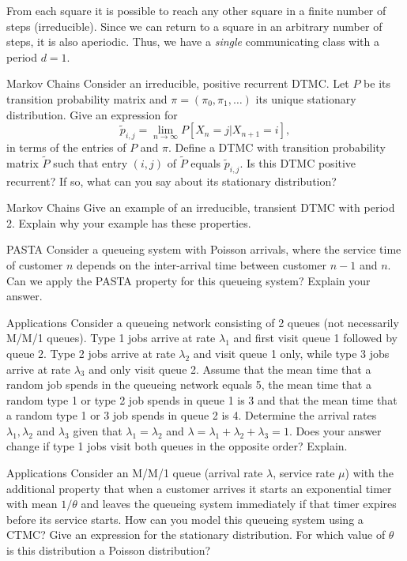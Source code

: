 \begin{solution}
  From each square it is possible to reach any other square in a finite number of steps (irreducible). Since we can return to a square in an arbitrary number of steps, it is also aperiodic. Thus, we have a \textit{single} communicating class with a period $d=1$.
\end{solution}

\begin{problem}{Markov Chains}
Consider an irreducible, positive recurrent DTMC. Let \( P \) be its transition probability matrix and \( \pi = (\pi_0, \pi_1, \ldots) \) its unique stationary distribution. Give an expression for
\[
\tilde{p}_{i,j} = \lim_{n \to \infty} P[X_n = j | X_{n+1} = i],
\]
in terms of the entries of \( P \) and \( \pi \). Define a DTMC with transition probability matrix \( \tilde{P} \) such that entry \( (i, j) \) of \( \tilde{P} \) equals \( \tilde{p}_{i,j} \). Is this DTMC positive recurrent? If so, what can you say about its stationary distribution?
\end{problem}

\begin{problem}{Markov Chains}
Give an example of an irreducible, transient DTMC with period 2. Explain why your example has these properties.
\end{problem}

\begin{problem}{PASTA}
Consider a queueing system with Poisson arrivals, where the service time of customer \( n \) depends on the inter-arrival time between customer \( n - 1 \) and \( n \). Can we apply the PASTA property for this queueing system? Explain your answer.
\end{problem}

\begin{problem}{Applications}
Consider a queueing network consisting of 2 queues (not necessarily M/M/1 queues). Type 1 jobs arrive at rate \( \lambda_1 \) and first visit queue 1 followed by queue 2. Type 2 jobs arrive at rate \( \lambda_2 \) and visit queue 1 only, while type 3 jobs arrive at rate \( \lambda_3 \) and only visit queue 2. Assume that the mean time that a random job spends in the queueing network equals 5, the mean time that a random type 1 or type 2 job spends in queue 1 is 3 and that the mean time that a random type 1 or 3 job spends in queue 2 is 4. Determine the arrival rates \( \lambda_1, \lambda_2 \) and \( \lambda_3 \) given that \( \lambda_1 = \lambda_2 \) and \( \lambda = \lambda_1 + \lambda_2 + \lambda_3 = 1 \). Does your answer change if type 1 jobs visit both queues in the opposite order? Explain.
\end{problem}

\begin{problem}{Applications}
Consider an M/M/1 queue (arrival rate \( \lambda \), service rate \( \mu \)) with the additional property that when a customer arrives it starts an exponential timer with mean \( 1/\theta \) and leaves the queueing system immediately if that timer expires before its service starts. How can you model this queueing system using a CTMC? Give an expression for the stationary distribution. For which value of \( \theta \) is this distribution a Poisson distribution?
\end{problem}

